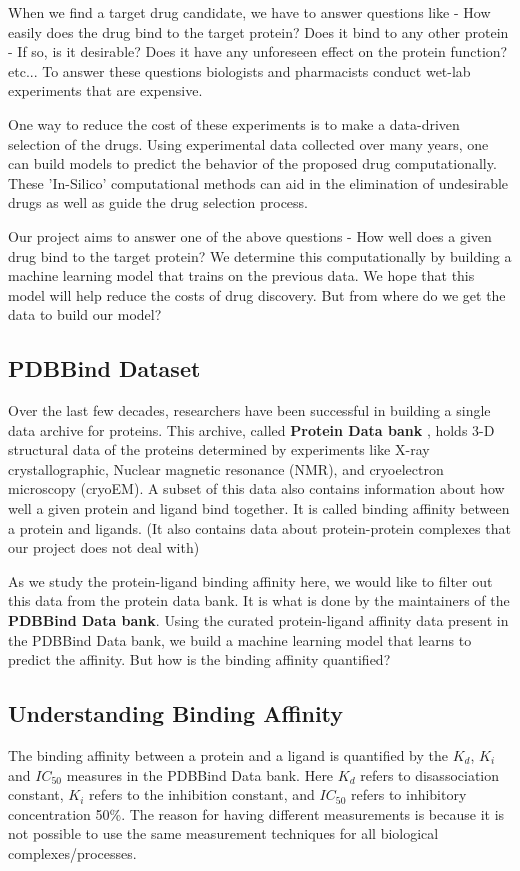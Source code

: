 \documentclass[11pt]{article}
\begin{document}
When we find a target drug candidate, we have to answer questions like - How easily does the drug bind to the target protein? Does it bind to any other protein - If so, is it desirable? Does it have any unforeseen effect on the protein function? etc...  To answer these questions biologists and pharmacists conduct wet-lab experiments that are expensive.

One way to reduce the cost of these experiments is to make a data-driven selection of the drugs.  Using experimental data collected over many years, one can build models to predict the behavior of the proposed drug computationally.  These 'In-Silico' computational methods can aid in the elimination of undesirable drugs as well as guide the drug selection process.

Our project aims to answer one of the above questions - How well does a given drug bind to the target protein? We determine this computationally by building a machine learning model that trains on the previous data.  We hope that this model will help reduce the costs of drug discovery.  But from where do we get the data to build our model?

\subsection{PDBBind Dataset}
Over the last few decades, researchers have been successful in building a single data archive for proteins.  This archive, called \textbf{Protein Data bank} \cite{pdb_homepage} , holds 3-D structural data of the proteins determined by experiments like X-ray crystallographic, Nuclear magnetic resonance (NMR), and cryoelectron microscopy (cryoEM).  A subset of this data also contains information about how well a given protein and ligand bind together.  It is called binding affinity between a protein and ligands.  (It also contains data about protein-protein complexes that our project does not deal with)
\cite{pdbank_history}

As we study the protein-ligand binding affinity here, we would like to filter out this data from the protein data bank.  It is what is done by the maintainers of the \textbf{PDBBind Data bank}.
\cite{pdbbind_introduction}
Using the curated protein-ligand affinity data present in the PDBBind Data bank, we build a machine learning model that learns to predict the affinity.  But how is the binding affinity quantified?

\subsection{Understanding Binding Affinity}
The binding affinity between a protein and a ligand is quantified by the $K_d$, $K_i$ and $IC_{50}$ measures in the PDBBind Data bank.
Here $K_d$ refers to disassociation constant, $K_i$ refers to the inhibition constant, and $IC_{50}$ refers to 
inhibitory concentration 50\%.
The reason for having different measurements is because it is not possible to use the same measurement techniques
for all biological complexes/processes.
\end{document}
